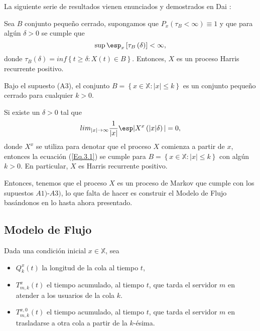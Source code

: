 La siguiente serie de resultados vienen enunciados y demostrados
en Dai \cite{Dai}:
\begin{Lema}
Sea $B$ conjunto peque\~no cerrado, supongamos que
$P_{x}\left(\tau_{B}<\infty\right)\equiv1$ y que para alg\'un
$\delta>0$ se cumple que
\begin{equation}\label{Eq.3.1}
\sup\esp_{x}\left[\tau_{B}\left(\delta\right)\right]<\infty,
\end{equation}
donde
$\tau_{B}\left(\delta\right)=inf\left\{t\geq\delta:X\left(t\right)\in
B\right\}$. Entonces, $X$ es un proceso Harris recurrente
positivo.
\end{Lema}

\begin{Lema}\label{Lema.3.}
Bajo el supuesto (A3), el conjunto
$B=\left\{x\in\mathbb{X}:|x|\leq k\right\}$ es un conjunto
peque\~no cerrado para cualquier $k>0$.
\end{Lema}

\begin{Teo}\label{Tma.3.1}
Si existe un $\delta>0$ tal que
\begin{equation}
lim_{|x|\rightarrow\infty}\frac{1}{|x|}\esp|X^{x}\left(|x|\delta\right)|=0,
\end{equation}
donde $X^{x}$ se utiliza para denotar que el proceso $X$ comienza
a partir de $x$, entonces la ecuaci\'on (\ref{Eq.3.1}) se cumple
para $B=\left\{x\in\mathbb{X}:|x|\leq k\right\}$ con alg\'un
$k>0$. En particular, $X$ es Harris recurrente positivo.
\end{Teo}

Entonces, tenemos que el proceso $X$ es un proceso de Markov que
cumple con los supuestos $A1)$-$A3)$, lo que falta de hacer es
construir el Modelo de Flujo bas\'andonos en lo hasta ahora
presentado.
\subsection{Modelo de Flujo}

Dada una condici\'on inicial $x\in\mathbb{X}$, sea

\begin{itemize}
\item $Q_{k}^{x}\left(t\right)$ la longitud de la cola al tiempo
$t$,

\item $T_{m,k}^{x}\left(t\right)$ el tiempo acumulado, al tiempo
$t$, que tarda el servidor $m$ en atender a los usuarios de la
cola $k$.

\item $T_{m,k}^{x,0}\left(t\right)$ el tiempo acumulado, al tiempo
$t$, que tarda el servidor $m$ en trasladarse a otra cola a partir de la $k$-\'esima.\\
\end{itemize}

